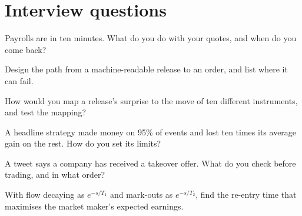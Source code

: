 \section{Interview questions}

\begin{interviewq}\label{iq:hf:news-and-event-trading:1}
Payrolls are in ten minutes. What do you do with your quotes, and when do you come back?
\end{interviewq}

\begin{interviewq}\label{iq:hf:news-and-event-trading:2}
Design the path from a machine-readable release to an order, and list where it can fail.
\end{interviewq}

\begin{interviewq}\label{iq:hf:news-and-event-trading:3}
How would you map a release's surprise to the move of ten different instruments, and test the mapping?
\end{interviewq}

\begin{interviewq}\label{iq:hf:news-and-event-trading:4}
A headline strategy made money on 95\% of events and lost ten times its average gain on the rest. How do you set its limits?
\end{interviewq}

\begin{interviewq}\label{iq:hf:news-and-event-trading:5}
A tweet says a company has received a takeover offer. What do you check before trading, and in what order?
\end{interviewq}

\begin{interviewq}\label{iq:hf:news-and-event-trading:6}
With flow decaying as $e^{-s/T_1}$ and mark-outs as $e^{-s/T_2}$, find the re-entry time that maximises the market maker's expected earnings.
\end{interviewq}
